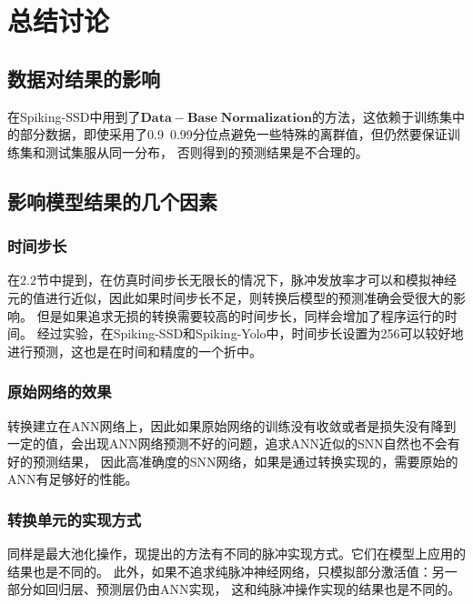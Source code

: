\chapter{总结讨论}
\section{数据对结果的影响}
\par
在Spiking-SSD中用到了$\mathbf{Data-Base\; Normalization}$的方法，这依赖于训练集中的部分数据，即使采用了0.9~0.99分位点避免一些特殊的离群值，但仍然要保证训练集和测试集服从同一分布，
否则得到的预测结果是不合理的。
\section{影响模型结果的几个因素}
\subsection{时间步长}
\par
在$2.2$节中提到，在仿真时间步长无限长的情况下，脉冲发放率才可以和模拟神经元的值进行近似，因此如果时间步长不足，则转换后模型的预测准确会受很大的影响。
但是如果追求无损的转换需要较高的时间步长，同样会增加了程序运行的时间。
经过实验，在Spiking-SSD和Spiking-Yolo中，时间步长设置为256可以较好地进行预测，这也是在时间和精度的一个折中。
\subsection{原始网络的效果}
\par
转换建立在ANN网络上，因此如果原始网络的训练没有收敛或者是损失没有降到一定的值，会出现ANN网络预测不好的问题，追求ANN近似的SNN自然也不会有好的预测结果，
因此高准确度的SNN网络，如果是通过转换实现的，需要原始的ANN有足够好的性能。
\subsection{转换单元的实现方式}
\par
同样是最大池化操作，现提出的方法有不同的脉冲实现方式。它们在模型上应用的结果也是不同的。
此外，如果不追求纯脉冲神经网络，只模拟部分激活值：另一部分如回归层、预测层仍由ANN实现，
这和纯脉冲操作实现的结果也是不同的。